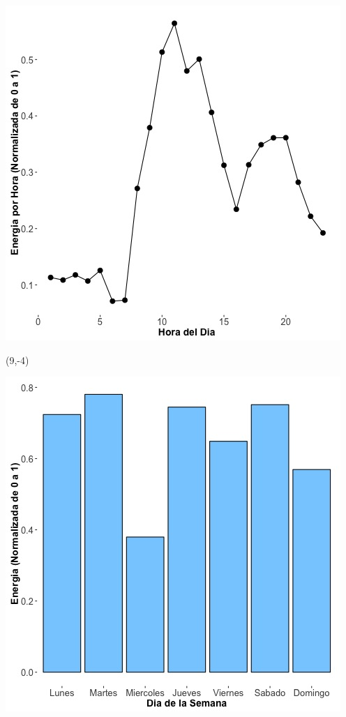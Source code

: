 \documentclass{article}\usepackage[]{graphicx}\usepackage[]{color}
\newenvironment{knitrout}{}{} %
\begin{document}
\begin{knitrout}
\color{fgcolor}
\includegraphics[scale=0.65]{figure/A6_plot_norm_median} 
\end{knitrout}


 \begin{textblock}{1}(9,-4)
\begin{minipage}{20em}
\begingroup

\endgroup
\end{minipage}
\end{textblock}


\begin{knitrout}
\color{fgcolor}
\includegraphics[scale=0.65]{figure/A6_day_of_week_plot} 
\end{knitrout}
\end{document}
